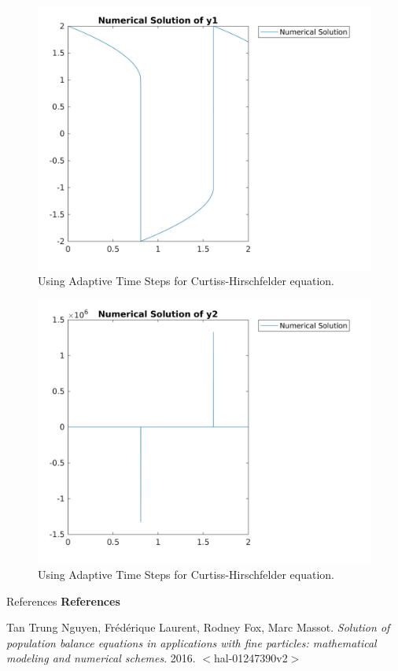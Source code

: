 \documentclass[9pt]{beamer}
\numberwithin{equation}{section}
\begin{document}
\begin{frame}
\begin{figure}
\centering
\includegraphics[scale=0.15]{ats_vdp_y1}
\caption{Using Adaptive Time Steps for Curtiss-Hirschfelder equation.}
\end{figure}
\end{frame}
\begin{frame}
\begin{figure}
\centering
\includegraphics[scale=0.15]{ats_vdp_y2}
\caption{Using Adaptive Time Steps for Curtiss-Hirschfelder equation.}
\end{figure}
\end{frame}



\begin{frame}{References}
\textbf{References}
\begin{thebibliography}{999}
 Tan Trung Nguyen, Frédérique Laurent, Rodney Fox, Marc Massot. \textit{Solution of population
balance equations in applications with fine particles: mathematical modeling and numerical
schemes}. 2016. $<$hal-01247390v2$>$
\end{thebibliography}

\end{frame}
\end{document}
